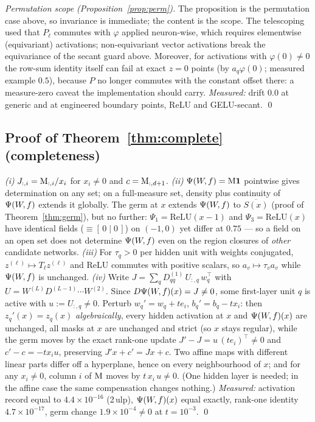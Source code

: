 \emph{Permutation scope (Proposition~\ref{prop:perm}).} The proposition is the
permutation case above, so invariance is immediate; the content is the scope.
The telescoping used that $P_\ell$ commutes with $\varphi$ applied
neuron-wise, which requires elementwise (equivariant) activations; non-equivariant
vector activations break the equivariance of the secant guard above. Moreover,
for activations with $\varphi(0)\neq0$ the row-sum identity itself can fail at
exact $z=0$ points (by $a_q\varphi(0)$; measured example $0.5$), because $P$ no
longer commutes with the constant offset there: a measure-zero caveat the
implementation should carry.
\emph{Measured:} drift $0.0$ at generic and at engineered boundary points,
ReLU and GELU-secant. \qed

\subsection{Proof of Theorem~\ref{thm:complete} (completeness)}

\emph{(i)} $J_{:,i}=\mathrm{M}_{:,i}/x_i$ for $x_i\neq0$ and $c=\mathrm{M}_{:,d+1}$.
\emph{(ii)} $\Psi(W\!,f)=\mathrm{M}\mathbf 1$ pointwise gives determination on any set; on a
full-measure set, density plus continuity of $\Psi(W\!,f)$ extends it globally. The germ
at $x$ extends $\Psi(W\!,f)$ to $\overline{S(x)}$ (proof of Theorem~\ref{thm:germ}),
but no further: $\Psi_1=\mathrm{ReLU}(x-1)$ and $\Psi_3=\mathrm{ReLU}(x)$ have
identical fields ($\equiv[\,0\mid0\,]$) on $(-1,0)$ yet differ at $0.75$ ---
so a field on an open set does not determine $\Psi(W\!,f)$ even on the region closures
of \emph{other} candidate networks.
\emph{(iii)} For $\tau_q>0$ per hidden unit with weights conjugated,
$z^{(\ell)}\mapsto T_\ell z^{(\ell)}$ and ReLU commutes with positive scalars,
so $a_v\mapsto\tau_v a_v$ while $\Psi(W\!,f)$ is unchanged.
\emph{(iv)} Write $J=\sum_q D^{(1)}_{qq}\,U_{:,q}\,w_q^{\top}$ with
$U=W^{(L)}D^{(L-1)}\cdots W^{(2)}$. Since $D\Psi(W\!,f)(x)=J\neq0$, some first-layer
unit $q$ is active with $u:=U_{:,q}\neq0$. Perturb $w_q'=w_q+t e_i$,
$b_q'=b_q-t x_i$: then $z_q'(x)=z_q(x)$ \emph{algebraically}, every hidden
activation at $x$ and $\Psi(W\!,f)(x)$ are unchanged, all masks at $x$ are unchanged and
strict (so $x$ stays regular), while the germ moves by the exact rank-one
update $J'-J=u\,(te_i)^{\top}\neq0$ and $c'-c=-t x_i u$, preserving
$J'x+c'=Jx+c$. Two affine maps with different linear parts differ off a
hyperplane, hence on every neighbourhood of $x$; and for any $x_i\neq0$,
column $i$ of $\mathrm{M}$ moves by $t\,x_i\,u\neq0$. (One hidden layer is needed; in
the affine case the same compensation changes nothing.)
\emph{Measured:} activation record equal to $4.4\times10^{-16}$ (2\,ulp),
$\Psi(W\!,f)(x)$ equal exactly, rank-one identity $4.7\times10^{-17}$, germ change
$1.9\times10^{-4}\neq0$ at $t=10^{-3}$. \qed

